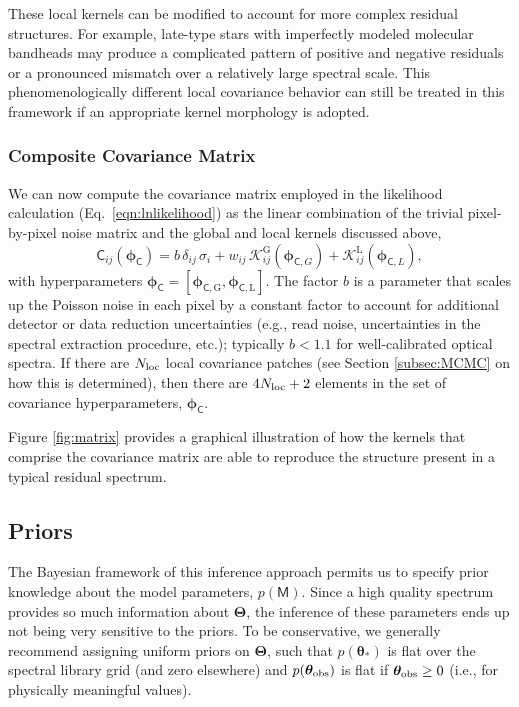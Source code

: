 \documentclass[iop,floatfix,numberedappendix,twocolappendix]{emulateapj}
\newcommand{\vM}{\mathsf{M}}
\newcommand{\vC}{\mathsf{C}}
\newcommand{\vt}{ {\bm \theta}}
\newcommand{\vT}{ {\bm \Theta}}
\newcommand{\vp}{ {\bm \phi}}
\newcommand{\cov}{ \vp_{\mathsf{C}}}
\newcommand{\KK}{\mathcal{K}}
\newcommand{\Kglobal}{\KK^{\textrm{G}}}
\newcommand{\Klocal}{\KK^{\textrm{L}}}
\begin{document}
These local kernels can be modified to account for more complex residual structures.  For example, 
late-type stars with imperfectly modeled molecular bandheads may produce a complicated pattern of 
positive and negative residuals or a pronounced mismatch over a relatively large spectral scale.  
This phenomenologically different local covariance behavior can still be treated in this framework 
if an appropriate kernel morphology is adopted. 

\subsubsection{Composite Covariance Matrix}

We can now compute the covariance matrix employed in the likelihood calculation 
(Eq.~\ref{eqn:lnlikelihood}) as the linear combination of the trivial pixel-by-pixel noise matrix 
and the global and local kernels discussed above, 
\begin{equation}
\vC_{ij}(\cov)  = b \, \delta_{ij} \, \sigma_i + w_{ij} \, \Kglobal_{ij}(\vp_{{\mathsf C}, G}) + 
                  \Klocal_{ij}(\vp_{{\mathsf C}, L}), 
\end{equation}
with hyperparameters $\cov = [\vp_{{\mathsf C}, \textrm{G}}, \vp_{{\mathsf C}, \textrm{L}}]$.  The factor $b$ is 
a parameter that scales up the Poisson noise in each pixel by a constant factor to account for 
additional detector or data reduction uncertainties (e.g., read noise, uncertainties in the 
spectral extraction procedure, etc.); typically $b < 1.1$ for well-calibrated optical spectra.  If 
there are $N_{\rm loc}$ local covariance patches (see Section \ref{subsec:MCMC} on how this is 
determined), then there are $4N_{\rm loc}+2$ elements in the set of covariance hyperparameters, 
$\cov$.  

Figure \ref{fig:matrix} provides a graphical illustration of how the kernels that comprise the 
covariance matrix are able to reproduce the structure present in a typical residual spectrum.  


\subsection{Priors} \label{subsec:priors}

The Bayesian framework of this inference approach permits us to specify prior knowledge about the 
model parameters, $p(\vM)$.  Since a high quality spectrum provides so much information about 
$\vT$, the inference of these parameters ends up not being very sensitive to the priors.  To be 
conservative, we generally recommend assigning uniform priors on $\vT$, such that $p(\vt_{\ast})$
is flat over the spectral library grid (and zero elsewhere) and $p(\vt_{\rm obs})$ is flat if 
$\vt_{\rm obs} \ge 0$ (i.e., for physically meaningful values).  
\end{document}
